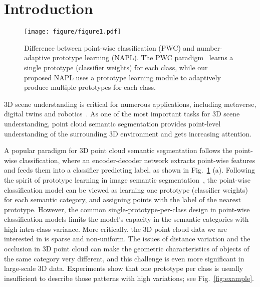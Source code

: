 \documentclass[runningheads]{llncs}
\begin{document}
\section{Introduction}
\begin{figure}[t]
    \centering
    \texttt{[image: figure/figure1.pdf]}
    \caption{Difference between point-wise classification (PWC) and number-adaptive prototype learning (NAPL).
    The PWC paradigm~\cite{hu2020randla,milioto2019rangenet++,zhu2021cylindrical} learns a single prototype (classifier weights) for each class, while  our proposed NAPL uses a prototype learning module to adaptively produce multiple prototypes for each class.
    }
    \label{fig:fig1}
\end{figure}

3D scene understanding is critical for numerous applications, including metaverse, digital twins and robotics~\cite{chen20203d}. As one of the most important tasks for 3D scene understanding, point cloud semantic segmentation provides point-level understanding of the surrounding 3D environment and gets increasing attention.

A popular paradigm for 3D point cloud semantic segmentation follows the point-wise classification, where an encoder-decoder network extracts point-wise features and feeds them into a classifier predicting label, as shown in Fig.~\ref{fig:fig1} (a). Following the spirit of prototype learning in image semantic segmentation~\cite{zhou2022rethinking}, the point-wise classification model can be viewed as learning one prototype (classifier weights) for each semantic category, and assigning points with the label of the nearest prototype. 
However, the common single-prototype-per-class design in point-wise classification models limits the model's capacity in the semantic categories with high intra-class variance. 
More critically, the 3D point cloud data we are interested in is sparse and non-uniform. The issues of distance variation and the occlusion in 3D point cloud can make the geometric characteristics of objects of the same category very different, and this challenge is even more significant in large-scale 3D data. Experiments show that one prototype per class is usually insufficient to describe those patterns with high variations; see Fig.~\ref{fig:example}. 
\end{document}
